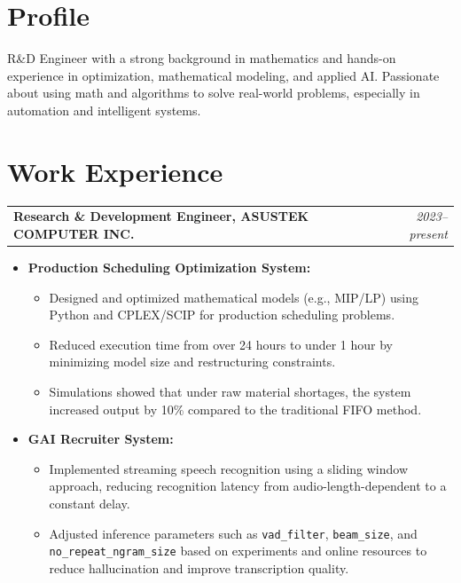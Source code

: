 \documentclass[a4paper,10pt]{article}
\newcommand{\coloredsection}[1]{\section*{\textcolor{blue!70!black}{#1}}}
\begin{document}
\vspace{0.5cm}
\noindent
\coloredsection{Profile}
R\&D Engineer with a strong background in mathematics and hands-on experience in optimization, mathematical modeling, and applied AI. Passionate about using math and algorithms to solve real-world problems, especially in automation and intelligent systems.


\vspace{0.5cm}
\coloredsection{Work Experience}
\begin{tabularx}{\textwidth}{Xr}
    \textbf{Research \& Development Engineer, ASUSTEK COMPUTER INC.} & \textit{2023--present} \\
\end{tabularx}
\begin{itemize}[leftmargin=30pt]
    \item \textbf{Production Scheduling Optimization System:}
    \begin{itemize}
        \item Designed and optimized mathematical models (e.g., MIP/LP) using Python and CPLEX/SCIP for production scheduling problems.
        \item Reduced execution time from over 24 hours to under 1 hour by minimizing model size and restructuring constraints.
        \item Simulations showed that under raw material shortages, the system increased output by 10\% compared to the traditional FIFO method.
    \end{itemize}
    \item \textbf{GAI Recruiter System:}
    \begin{itemize}
        \item Implemented streaming speech recognition using a sliding window approach, reducing recognition latency from audio-length-dependent to a constant delay.
        \item Adjusted inference parameters such as \texttt{vad\_filter}, \texttt{beam\_size}, and \texttt{no\_repeat\_ngram\_size} based on experiments and online resources to reduce hallucination and improve transcription quality.
    \end{itemize}
\end{itemize}
\end{document}
